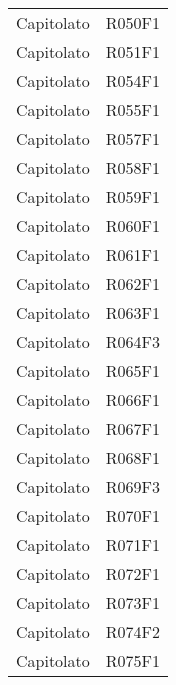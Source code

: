 \documentclass[../analisi-dei-requisiti.tex]{subfiles}
\begin{document}
\begin{longtable}[H]{ p{4cm} | p{4cm} }
  Capitolato                    & R050F1                               \\
  Capitolato                    & R051F1                               \\
  Capitolato                    & R054F1                               \\
  Capitolato                    & R055F1                               \\
  Capitolato                    & R057F1                               \\
  Capitolato                    & R058F1                               \\
  Capitolato                    & R059F1                               \\
  Capitolato                    & R060F1                               \\
  Capitolato                    & R061F1                               \\
  Capitolato                    & R062F1                               \\
  Capitolato                    & R063F1                               \\
  Capitolato                    & R064F3                               \\
  Capitolato                    & R065F1                               \\
  Capitolato                    & R066F1                               \\
  Capitolato                    & R067F1                               \\
  Capitolato                    & R068F1                               \\
  Capitolato                    & R069F3                               \\
  Capitolato                    & R070F1                               \\
  Capitolato                    & R071F1                               \\
  Capitolato                    & R072F1                               \\
  Capitolato                    & R073F1                               \\
  Capitolato                    & R074F2                               \\
  Capitolato                    & R075F1                               \\

\end{longtable}
\end{document}
